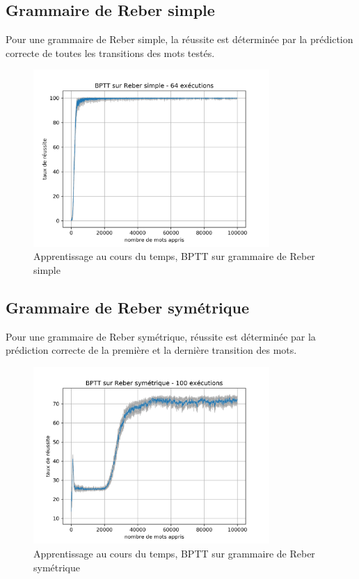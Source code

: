 \subsection{Grammaire de Reber simple}
Pour une grammaire de Reber simple, la réussite est déterminée par la prédiction
correcte de toutes les transitions des mots testés.

\begin{figure}[!ht]
\begin{center}
\includegraphics[width=0.8\textwidth]{images/results/bptt_simplereber_ls30_lr01.png}
\caption{Apprentissage au cours du temps, BPTT sur grammaire de Reber simple}
\end{center}
\end{figure}

\subsection{Grammaire de Reber symétrique}
Pour une grammaire de Reber symétrique, réussite est déterminée par la prédiction
correcte de la première et la dernière transition des mots.

\begin{figure}[!ht]
\begin{center}
\includegraphics[width=0.8\textwidth]{images/results/bptt_doublereber_ls30_lr01.png}
\caption{Apprentissage au cours du temps, BPTT sur grammaire de Reber symétrique}
\end{center}
\end{figure}
